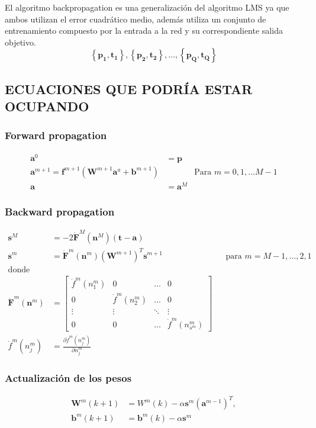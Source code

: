 \documentclass[12pt, titlepage]{article}
\begin{document}
El algoritmo backpropagation es una generalización del algoritmo LMS ya que ambos utilizan el error cuadrático medio, además utiliza un conjunto de entrenamiento compuesto por la entrada a la red y su correspondiente salida objetivo.
\[ \left\lbrace \boldsymbol{p_1}, \boldsymbol{t_1} \right\rbrace, \left\lbrace \boldsymbol{p_2}, \boldsymbol{t_2} \right\rbrace, \dots, \left\lbrace \boldsymbol{p_Q}, \boldsymbol{t_Q} \right\rbrace  \]

\subsection{ECUACIONES QUE PODRÍA ESTAR OCUPANDO}
\subsubsection{Forward propagation}
\begin{align*}
 \boldsymbol{a}^0 &= \boldsymbol{p} \\
 \boldsymbol{a}^{m+1} = 
\boldsymbol{f}^{m+1}(\boldsymbol{W}^{m+1}\boldsymbol{a}^{a}+\boldsymbol{b}^{m+1}
) & & \text{Para $m=0, 1, \ldots M-1$} \\
 \boldsymbol{a} &= \boldsymbol{a}^{M}
\end{align*}
\subsubsection{Backward propagation}
\begin{align*}
    \boldsymbol{s}^M &= 
-2\boldsymbol{\dot{F}}^{M}(\boldsymbol{n}^{M})(\boldsymbol{t-a}) \\
    \boldsymbol{s}^{m} &= 
\boldsymbol{\dot{F}}^{m}(\boldsymbol{n}^{m})(\boldsymbol{W}^{m+1})^{T}
\boldsymbol{s}^{m+1} & & \text{para $m=M-1, \ldots, 2, 1$} \\
\text{donde} \\
\boldsymbol{\dot{F}}^{m}(\boldsymbol{n}^{m}) &=
\begin{bmatrix}
  \dot{f}^{m}(n_{1}^{m}) & 0 & \ldots & 0 \\
  0 & \dot{f}^{m}(n_{2}^{m}) & \ldots & 0 \\
  \vdots & \vdots & \ddots & \vdots \\
  0 & 0 & \ldots & \dot{f}^{m}(n_{s^{m}}^{m})
\end{bmatrix} \\
\dot{f}^{m}(n_{j}^{m}) &= 
\frac{\partial \dot{f}^{m}(n_{j}^{m})}{\partial n_{j}^{m}}
\end{align*}
\subsubsection{Actualización de los pesos}
\begin{align*}
    \boldsymbol{W}^{m}(k+1) &= W^{m}(k)-\alpha 
\boldsymbol{s}^{m}(\boldsymbol{a}^{m-1})^{T}, \\
\boldsymbol{b}^{m}(k+1) &= \boldsymbol{b}^{m}(k) - \alpha \boldsymbol{s}^{m}
\end{align*}
\end{document}
